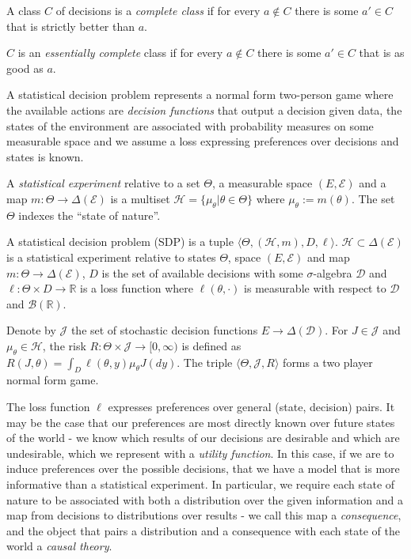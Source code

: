 \begin{definition}
A class $C$ of decisions is a \emph{complete class} if for every $a\not\in C$ there is some $a'\in C$ that is strictly better than $a$.

$C$ is an \emph{essentially complete} class if for every $a\not\in C$ there is some $a'\in C$ that is as good as $a$.
\end{definition}

A statistical decision problem represents a normal form two-person game where the available actions are \emph{decision functions} that output a decision given data, the states of the environment are associated with probability measures on some measurable space and we assume a loss expressing preferences over decisions and states is known.

\begin{definition}\label{def:stat_expt}
A \emph{statistical experiment} relative to a set $\Theta$, a measurable space $(E,\mathcal{E})$ and a map $m:\Theta\to \Delta(\mathcal{E})$ is a multiset $\mathscr{H}=\{\mu_\theta|\theta\in \Theta\}$ where $\mu_\theta:=m(\theta)$. The set $\Theta$ indexes the ``state of nature''.
\end{definition}


\begin{definition}
A statistical decision problem (SDP) is a tuple $\langle\Theta, (\mathscr{H},m), D, \ell\rangle$. $\mathscr{H}\subset\Delta(\mathcal{E})$ is a statistical experiment relative to states $\Theta$, space $(E,\mathcal{E})$ and map $m:\Theta\to \Delta(\mathcal{E})$, $D$ is the set of available decisions with some $\sigma$-algebra $\mathcal{D}$ and $\ell:\Theta\times D\to \mathbb{R}$ is a loss function where $\ell(\theta,\cdot)$ is measurable with respect to $\mathcal{D}$ and $\mathcal{B}(\mathbb{R})$.

Denote by $\mathscr{J}$ the set of stochastic decision functions $E\to \Delta(\mathcal{D})$. For $J\in \mathscr{J}$ and $\mu_\theta\in \mathcal{H}$, the risk $R:\Theta\times\mathscr{J}\to [0,\infty)$ is defined as $R(J,\theta) = \int_D \ell(\theta,y) \mu_\theta J(dy)$. The triple $\langle \Theta, \mathscr{J}, R\rangle$ forms a two player normal form game.
\end{definition}

The loss function $\ell$ expresses preferences over general (state, decision) pairs. It may be the case that our preferences are most directly known over future states of the world - we know which results of our decisions are desirable and which are undesirable, which we represent with a \emph{utility function}. In this case, if we are to induce preferences over the possible decisions, that we have a model that is more informative than a statistical experiment. In particular, we require each state of nature to be associated with both a distribution over the given information and a map from decisions to distributions over results - we call this map a \emph{consequence}, and the object that pairs a distribution and a consequence with each state of the world a \emph{causal theory}.

